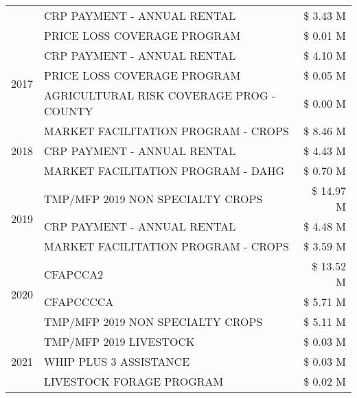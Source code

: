 \begin{tabular}{llr}
 & CRP PAYMENT - ANNUAL RENTAL & \$ 3.43 M \\
 & PRICE LOSS COVERAGE PROGRAM & \$ 0.01 M \\
\cline{1-3}
\multirow[t]{3}{*}{2017} & CRP PAYMENT - ANNUAL RENTAL & \$ 4.10 M \\
 & PRICE LOSS COVERAGE PROGRAM & \$ 0.05 M \\
 & AGRICULTURAL RISK COVERAGE PROG - COUNTY & \$ 0.00 M \\
\cline{1-3}
\multirow[t]{3}{*}{2018} & MARKET FACILITATION PROGRAM - CROPS & \$ 8.46 M \\
 & CRP PAYMENT - ANNUAL RENTAL & \$ 4.43 M \\
 & MARKET FACILITATION PROGRAM - DAHG & \$ 0.70 M \\
\cline{1-3}
\multirow[t]{3}{*}{2019} & TMP/MFP 2019 NON SPECIALTY CROPS & \$ 14.97 M \\
 & CRP PAYMENT - ANNUAL RENTAL & \$ 4.48 M \\
 & MARKET FACILITATION PROGRAM - CROPS & \$ 3.59 M \\
\cline{1-3}
\multirow[t]{3}{*}{2020} & CFAPCCA2 & \$ 13.52 M \\
 & CFAPCCCCA & \$ 5.71 M \\
 & TMP/MFP 2019 NON SPECIALTY CROPS & \$ 5.11 M \\
\cline{1-3}
\multirow[t]{3}{*}{2021} & TMP/MFP 2019 LIVESTOCK & \$ 0.03 M \\
 & WHIP PLUS 3 ASSISTANCE & \$ 0.03 M \\
 & LIVESTOCK FORAGE PROGRAM & \$ 0.02 M \\
\cline{1-3}
\bottomrule
\end{tabular}
